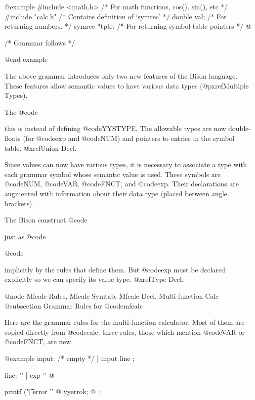{{{{{{{{{{@example
#include <math.h>  /* For math functions, cos(), sin(), etc      */
#include "calc.h"  /* Contains definition of `symrec' */
double     val;  /* For returning numbers.              */
symrec  *tptr;   /* For returning symbol-table pointers */
@}



/* Grammar follows */

@end example

The above grammar introduces only two new features of the Bison language.
These features allow semantic values to have various data types
(@pxref{Multiple Types}).

The @code{%
this is instead of defining @code{YYSTYPE}.  The allowable types are now
double-floats (for @code{exp} and @code{NUM}) and pointers to entries in
the symbol table.  @xref{Union Decl}.

Since values can now have various types, it is necessary to associate a
type with each grammar symbol whose semantic value is used.  These symbols
are @code{NUM}, @code{VAR}, @code{FNCT}, and @code{exp}.  Their
declarations are augmented with information about their data type (placed
between angle brackets).

The Bison construct @code{%
just as @code{%
@code{%
implicitly by the rules that define them.  But @code{exp} must be declared
explicitly so we can specify its value type.  @xref{Type Decl}.

@node Mfcalc Rules, Mfcalc Symtab, Mfcalc Decl, Multi-function Calc
@subsection Grammar Rules for @code{mfcalc}

Here are the grammar rules for the multi-function calculator.
Most of them are copied directly from @code{calc}; three rules,
those which mention @code{VAR} or @code{FNCT}, are new.

@example
input:   /* empty */
        | input line
;

line:
          '\n'
        | exp '\n'   @{ printf ("\t%
        | error '\n' @{ yyerrok;                  @}
;

}}}}}}}}}}}}}}
